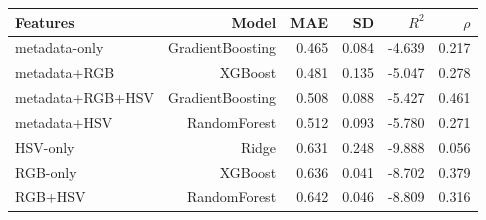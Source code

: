 \begin{tabular}{lrrrrr}
\toprule
Features & Model & MAE & SD &  $R^2$ & $\rho$ \\
\midrule
metadata-only & GradientBoosting & 0.465 & 0.084 & -4.639 & 0.217 \\
metadata+RGB & XGBoost & 0.481 & 0.135 & -5.047 & 0.278 \\
metadata+RGB+HSV & GradientBoosting & 0.508 & 0.088 & -5.427 & 0.461 \\
metadata+HSV & RandomForest & 0.512 & 0.093 & -5.780 & 0.271 \\
HSV-only & Ridge & 0.631 & 0.248 & -9.888 & 0.056 \\
RGB-only & XGBoost & 0.636 & 0.041 & -8.702 & 0.379 \\
RGB+HSV & RandomForest & 0.642 & 0.046 & -8.809 & 0.316 \\
\bottomrule
\end{tabular}
